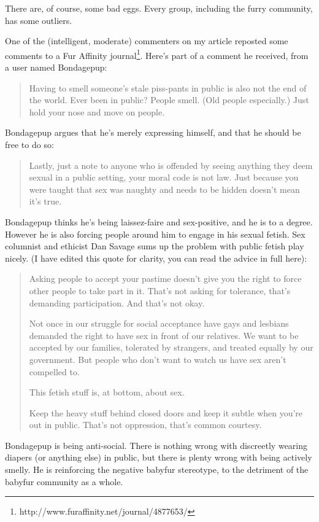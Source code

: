 There are, of course, some bad eggs. Every group, including the furry community, has some outliers.

One of the (intelligent, moderate) commenters on my article reposted some comments to a Fur Affinity journal\footnote{http://www.furaffinity.net/journal/4877653/}. Here's part of a comment he received, from a user named Bondagepup:

\begin{quote}
  Having to smell someone's stale piss-pants in public is also not the end of the world. Ever been in public? People smell. (Old people especially.) Just hold your nose and move on people.
\end{quote}

Bondagepup argues that he's merely expressing himself, and that he should be free to do so:

\begin{quote}
  Lastly, just a note to anyone who is offended by seeing anything they deem sexual in a public setting, your moral code is not law. Just because you were taught that sex was naughty and needs to be hidden doesn't mean it's true.
\end{quote}

Bondagepup thinks he's being laissez-faire and sex-positive, and he is to a degree. However he is also forcing people around him to engage in his sexual fetish. Sex columnist and ethicist Dan Savage sums up the problem with public fetish play nicely. (I have edited this quote for clarity, you can read the advice in full here):

\begin{quotation}
  Asking people to accept your pastime doesn't give you the right to force other people to take part in it. That's not asking for tolerance, that's demanding participation. And that's not okay.

  Not once in our struggle for social acceptance have gays and lesbians demanded the right to have sex in front of our relatives. We want to be accepted by our families, tolerated by strangers, and treated equally by our government. But people who don't want to watch us have sex aren't compelled to.

  This fetish stuff is, at bottom, about sex.

  Keep the heavy stuff behind closed doors and keep it subtle when you're out in public. That's not oppression, that's common courtesy.
\end{quotation}

Bondagepup is being anti-social. There is nothing wrong with discreetly wearing diapers (or anything else) in public, but there is plenty wrong with being actively smelly. He is reinforcing the negative babyfur stereotype, to the detriment of the babyfur community as a whole.

